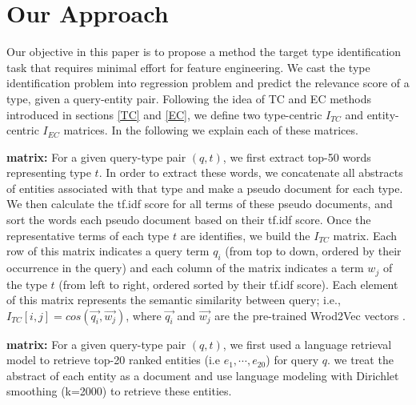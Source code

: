 \section{Our Approach}
Our objective in this paper is to propose a method the target type identification task that requires minimal effort for feature engineering.  We cast the type identification problem into regression problem and predict the relevance score of a type, given a query-entity pair.
Following the idea of TC and EC methods introduced in sections \ref{TC} and \ref{EC}, we define two type-centric $I_{TC}$ and entity-centric $I_{EC}$ matrices.  In the following we explain each of these matrices.%

%
 \textbf{matrix:} For a given query-type pair $(q,t)$, we first extract top-50 words representing type $t$. In order to extract these words, we concatenate all abstracts of entities associated with that type and make a pseudo document for each type. We then calculate the tf.idf score for all terms of these pseudo documents, and sort the words each  pseudo document based on their tf.idf score. Once the representative terms of each type $t$ are identifies, we build the $I_{TC}$ matrix. Each row of this matrix indicates a query term $q_i$ (from top to down, ordered by their occurrence in the query) and each column of the matrix indicates a term $w_j$ of the type $t$ (from left to right, ordered sorted by their tf.idf score). Each element of this matrix represents the semantic similarity between query; i.e.,  $I_{TC}[i,j] = cos(\vec{q_i}, \vec{w_j})$, where $\vec{q_i}$ and $\vec{w_j}$ are the pre-trained Wrod2Vec vectors \cite{Mikolov:2013:DRW:2999792.2999959}.

 \textbf{matrix:} For a given query-type pair $(q,t)$, we first used a language retrieval model to retrieve top-20 ranked entities (i.e $e_1,\cdots, e_{20}$) for query $q$.
we treat the abstract of each entity as a document and use language modeling with Dirichlet smoothing (k=2000) to retrieve these entities.

